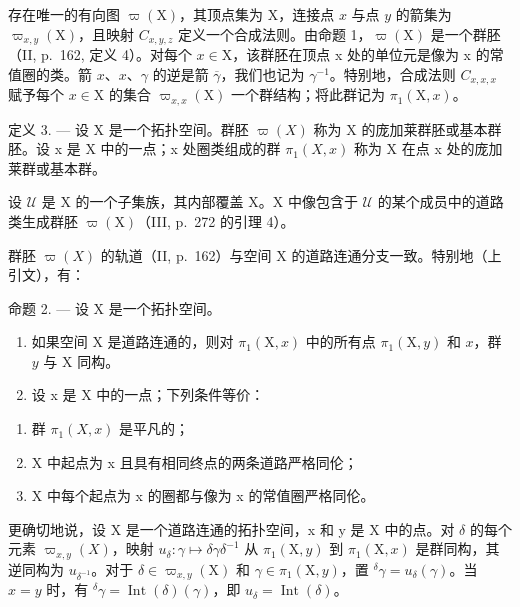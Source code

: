 存在唯一的有向图 \(\varpi(\mathrm{X})\)，其顶点集为 X，连接点 \(x\) 与点 \(y\) 的箭集为 \(\varpi_{x,y}(\mathrm{X})\)，且映射 \(C_{x,y,z}\) 定义一个合成法则。由命题 1，\(\varpi(\mathrm{X})\) 是一个群胚（II, p.~162, 定义 4）。对每个 \(x \in \mathrm{X}\)，该群胚在顶点 x 处的单位元是像为 x 的常值圈的类。箭 \(x\)、\(x\)、\(\gamma\) 的逆是箭 \(\overline{\gamma}\)，我们也记为 \(\gamma^{-1}\)。特别地，合成法则 \(C_{x,x,x}\) 赋予每个 \(x \in \mathrm{X}\) 的集合 \(\varpi_{x,x}(\mathrm{X})\) 一个群结构；将此群记为 \(\pi_1(\mathrm{X}, x)\)。

定义 3. --- 设 X 是一个拓扑空间。群胚 \(\varpi(X)\) 称为 X 的庞加莱群胚或基本群胚。设 x 是 X 中的一点；x 处圈类组成的群 \(\pi_1(X,x)\) 称为 X 在点 x 处的庞加莱群或基本群。

设 \(\mathcal{U}\) 是 X 的一个子集族，其内部覆盖 X。X 中像包含于 \(\mathcal{U}\) 的某个成员中的道路类生成群胚 \(\varpi(\mathrm{X})\)（III, p.~272 的引理 4）。

群胚 \(\varpi(X)\) 的轨道（II, p.~162）与空间 X 的道路连通分支一致。特别地（上引文），有：

命题 2. --- 设 X 是一个拓扑空间。

\begin{enumerate}
\def\labelenumi{\alph{enumi})}
\item
  如果空间 X 是道路连通的，则对 \(\pi_1(\mathrm{X},x)\) 中的所有点 \(\pi_1(\mathrm{X},y)\) 和 \(x\)，群 \(y\) 与 \(\mathrm{X}\) 同构。
\item
  设 x 是 X 中的一点；下列条件等价：
\end{enumerate}

\begin{enumerate}
\def\labelenumi{(\roman{enumi})}
\item
  群 \(\pi_1(X,x)\) 是平凡的；
\item
  X 中起点为 x 且具有相同终点的两条道路严格同伦；
\item
  X 中每个起点为 x 的圈都与像为 x 的常值圈严格同伦。
\end{enumerate}

更确切地说，设 X 是一个道路连通的拓扑空间，x 和 y 是 X 中的点。对 \(\delta\) 的每个元素 \(\varpi_{x,y}(X)\)，映射 \(u_{\delta} \colon \gamma \mapsto \delta \gamma \delta^{-1}\) 从 \(\pi_1(\mathrm{X},y)\) 到 \(\pi_1(\mathrm{X},x)\) 是群同构，其逆同构为 \(u_{\delta^{-1}}\)。对于 \(\delta \in \varpi_{x,y}(\mathrm{X})\) 和 \(\gamma \in \pi_1(\mathrm{X},y)\)，置 \(^{\delta}\gamma = u_{\delta}(\gamma)\)。当 \(x = y\) 时，有 \(^{\delta}\gamma = \operatorname{Int}(\delta)(\gamma)\)，即 \(u_{\delta} = \operatorname{Int}(\delta)\)。

